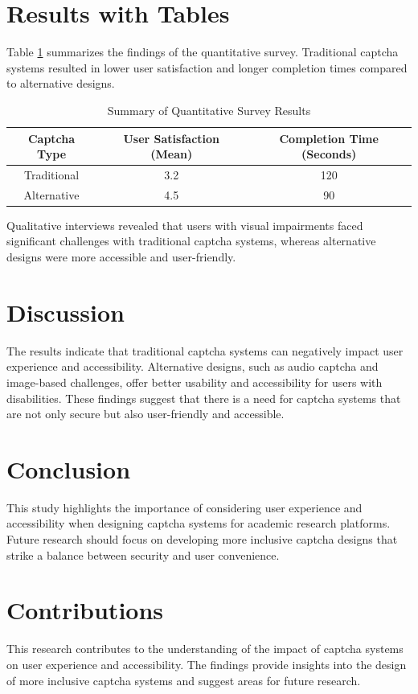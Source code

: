 \documentclass{article}
\begin{document}
\section{Results with Tables}
Table \ref{table:results} summarizes the findings of the quantitative survey. Traditional captcha systems resulted in lower user satisfaction and longer completion times compared to alternative designs.

\begin{table}[h]
\centering
\begin{tabular}{|c|c|c|}
\hline
\textbf{Captcha Type} & \textbf{User Satisfaction (Mean)} & \textbf{Completion Time (Seconds)} \\
\hline
Traditional & 3.2 & 120 \\
Alternative & 4.5 & 90 \\
\hline
\end{tabular}
\caption{Summary of Quantitative Survey Results}
\label{table:results}
\end{table}

Qualitative interviews revealed that users with visual impairments faced significant challenges with traditional captcha systems, whereas alternative designs were more accessible and user-friendly.

\section{Discussion}
The results indicate that traditional captcha systems can negatively impact user experience and accessibility. Alternative designs, such as audio captcha and image-based challenges, offer better usability and accessibility for users with disabilities. These findings suggest that there is a need for captcha systems that are not only secure but also user-friendly and accessible.

\section{Conclusion}
This study highlights the importance of considering user experience and accessibility when designing captcha systems for academic research platforms. Future research should focus on developing more inclusive captcha designs that strike a balance between security and user convenience.

\section{Contributions}
This research contributes to the understanding of the impact of captcha systems on user experience and accessibility. The findings provide insights into the design of more inclusive captcha systems and suggest areas for future research.



\end{document}

